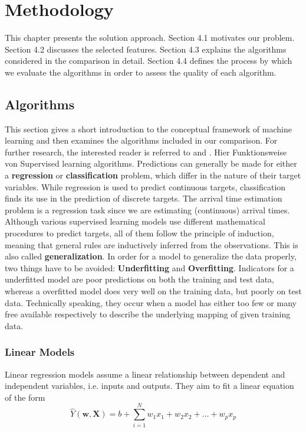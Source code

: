 \chapter{Methodology}
This chapter presents the solution approach.
Section 4.1 motivates our problem. 
Section 4.2 discusses the selected features.
Section 4.3 explains the algorithms considered in the comparison in detail.
Section 4.4 defines the process by which we evaluate the algorithms in order to assess the quality of each algorithm.


\section{Algorithms}
This section gives a short introduction to the conceptual framework of machine learning and then examines the algorithms included in our comparison. For further research, the interested reader is referred to \cite{Bishop} and \cite{SLFoundations}.
\newline
\newline
Hier Funktionsweise von Supervised learning algorithms.
\newline
\newline
Predictions can generally be made for either a \textbf{regression} or \textbf{classification} problem, which differ in the nature of their target variables. While regression is used to predict continuous targets, classification finds its use in the prediction of discrete targets. The arrival time estimation problem is a regression task since we are estimating (continuous) arrival times.
Although various supervised learning models use different mathematical procedures to predict targets, all of them follow the principle of induction, meaning that general rules are inductively inferred from the observations. This is also called \textbf{generalization}.  
In order for a model to generalize the data properly, two things have to be avoided: \textbf{Underfitting} and \textbf{Overfitting}. Indicators for a underfitted model are poor predictions on both the training and test data, whereas a overfitted model does very well on the training data, but poorly on test data. Technically speaking, they occur when a model has either too few or many free available respectively to describe the underlying mapping of given training data. 

\subsection{Linear Models}
Linear regression models assume a linear relationship between dependent and independent variables, i.e. inputs and outputs. They aim to fit a linear equation of the form 
\begin{equation}
\hat Y(\mathbf{w},\mathbf{X}) = b + \sum_{i=1}^N w_1x_1 + w_2x_2 + \dots + w_px_p	
\end{equation}

